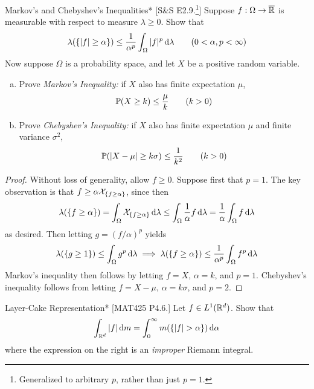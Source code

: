 \begin{problem}{Markov's and Chebyshev's Inequalities}*
    [S\&S E2.9.\footnote{Generalized to arbitrary \(p\), rather than just \(p=1\).}] Suppose \(f : \Omega \to \overline{\mathbb{R}}\) is measurable with respect to measure \(\lambda \geq 0\). Show that 
    \[
        \lambda(\{|f| \geq \alpha\}) \leq \frac{1}{\alpha^p} \int_{\Omega} |f|^p \, \mathrm{d}\lambda \qquad (0 < \alpha, p < \infty)
    \]
    Now suppose \(\Omega\) is a probability space, and let \(X\) be a positive random variable.
    \begin{enumerate}[(a)]
        \itemsep0em
        \item Prove \emph{Markov's Inequality:} if \(X\) also has finite expectation \(\mu\), 
        \[
            \mathbb{P}(X \geq k) \leq \frac{\mu}{k}
            \qquad (k > 0)
        \]
        \item Prove \emph{Chebyshev's Inequality:} if \(X\) also has finite expectation \(\mu\) and finite variance \(\sigma^2\), 
        \[
            \mathbb{P}(|X - \mu| \geq k \sigma) \leq \frac{1}{k^2}
            \qquad (k > 0)
        \]
    \end{enumerate}
\end{problem}

\begin{proof}
    Without loss of generality, allow \(f \geq 0\). Suppose first that \(p = 1\). The key observation is that \(f \geq \alpha \mathcal{X}_{\{f \geq \alpha\}}\), since then
    \[
        \lambda(\{f \geq \alpha\})
        = \int_{\Omega} \mathcal{X}_{\{f \geq \alpha\}} \, \mathrm{d}\lambda
        \leq \int_{\Omega} \frac{1}{\alpha} f \, \mathrm{d} \lambda
        = \frac{1}{\alpha} \int_{\Omega} f \, \mathrm{d} \lambda
    \]
    as desired. Then letting \(g = (f / \alpha)^p\) yields 
    \[
        \lambda(\{g \geq 1\}) \leq \int_{\Omega} g^p \, \mathrm{d}\lambda
        \implies 
        \lambda(\{f \geq \alpha\}) \leq \frac{1}{\alpha^p} \int_{\Omega} f^p \, \mathrm{d}\lambda
    \]
    Markov's inequality then follows by letting \(f = X\), \(\alpha = k\), and \(p = 1\). Chebyshev's inequality follows from letting \(f = X - \mu\), \(\alpha = k \sigma\), and \(p = 2\). 
\end{proof}

\begin{problem}{Layer-Cake Representation}*
    [MAT425 P4.6.] Let \(f \in L^1(\mathbb{R}^d)\). Show that 
    \[
        \int_{\mathbb{R}^d} |f| \, \mathrm{d}m = \int_0^\infty m(\{|f| > \alpha\}) \, \mathrm{d}\alpha
    \]
    where the expression on the right is an \emph{improper} Riemann integral. 
\end{problem}

